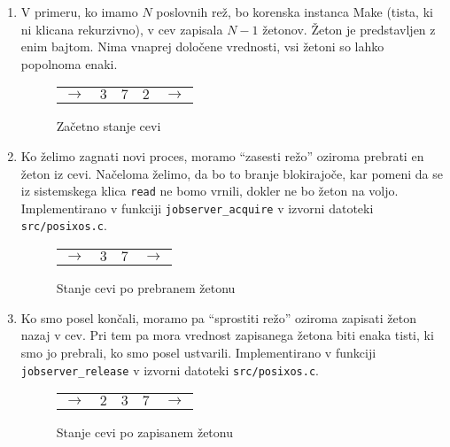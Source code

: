 \documentclass[notitlepage]{report}
\begin{document}
\begin{enumerate}
\item V primeru, ko imamo $N$ poslovnih rež, bo korenska instanca Make
  (tista, ki ni klicana rekurzivno), v cev zapisala $N - 1$
  žetonov. Žeton je predstavljen z enim bajtom. Nima vnaprej določene
  vrednosti, vsi žetoni so lahko popolnoma enaki.

  \begin{figure}[H]
    \begin{center}
      \begin{tabular}{ cc|c|cc }
        \cline{2-4}
        $\rightarrow$ & $3$ & $7$ & $2$ & $\rightarrow$ \\
        \cline{2-4}
      \end{tabular}
      \end{center}
    \caption{Začetno stanje cevi}
  \end{figure}
\item Ko želimo zagnati novi proces, moramo ``zasesti režo'' oziroma
  prebrati en žeton iz cevi. Načeloma želimo, da bo to branje
  blokirajoče, kar pomeni da se iz sistemskega klica \verb|read| ne
  bomo vrnili, dokler ne bo žeton na voljo. Implementirano v funkciji
  \verb|jobserver_acquire| v izvorni datoteki \verb|src/posixos.c|.
  
  \begin{figure}[H]
    \begin{center}
      \begin{tabular}{ cc|cc }
        \cline{2-3}
        $\rightarrow$ & $3$ & $7$ & $\rightarrow$ \\
        \cline{2-3}
      \end{tabular}
      \end{center}
    \caption{Stanje cevi po prebranem žetonu}
  \end{figure}

\item Ko smo posel končali, moramo pa ``sprostiti režo'' oziroma
  zapisati žeton nazaj v cev. Pri tem pa mora vrednost zapisanega žetona biti
  enaka tisti, ki smo jo prebrali, ko smo posel ustvarili. Implementirano v funkciji
  \verb|jobserver_release| v izvorni datoteki \verb|src/posixos.c|.

    \begin{figure}[H]
    \begin{center}
      \begin{tabular}{ cc|c|cc }
        \cline{2-4}
        $\rightarrow$ & $2$ & $3$ & $7$ & $\rightarrow$ \\
        \cline{2-4}
      \end{tabular}
      \end{center}
    \caption{Stanje cevi po zapisanem žetonu}
  \end{figure}
  
\end{enumerate}
\end{document}
